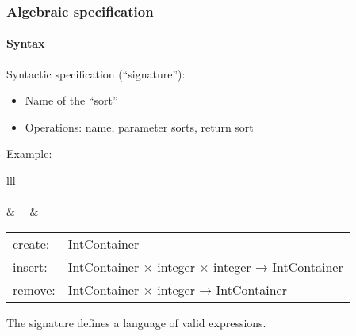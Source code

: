 \documentclass{beamer}
\begin{document}
\begin{frame}[fragile]
\frametitle{Algebraic specification}
\framesubtitle{Syntax}

Syntactic specification (``signature''):
\begin{itemize}
\item Name of the ``sort''
\item Operations: name, parameter sorts, return sort
\end{itemize}
\bigskip

Example:
\begin{tabular}{lll}
\\
\\
 & \ \ & 
   \begin{tabular}{ll}
   create:& IntContainer\\
   insert:& IntContainer × integer × integer → IntContainer\\
   remove:& IntContainer × integer → IntContainer \\
   \end{tabular}
\end{tabular} 
\bigskip



The signature defines a language of valid expressions.


\end{frame}
\end{document}
